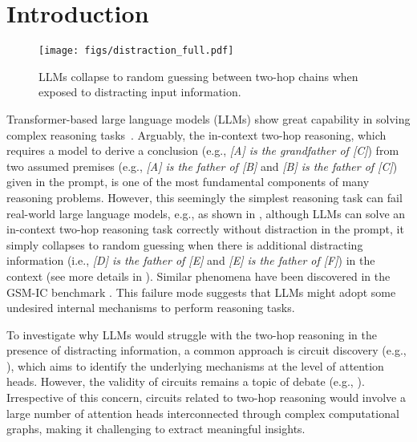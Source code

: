 \section{Introduction}
\label{sec:intro}

\begin{figure}[h]
    \centering
    \texttt{[image: figs/distraction\_full.pdf]}
    \caption{LLMs collapse to random guessing between two-hop chains when exposed to distracting input information.}
    \label{fig:llm-distraction}
\end{figure}


Transformer-based large language models (LLMs) show great capability in solving complex reasoning tasks~\citep{reynolds2021prompt,kojima2022large,brown2020language,wei2022chain,wang2022self,nye2021show,cobbe2021training,zelikman2022star}. Arguably, the in-context two-hop reasoning, which requires a model to derive a conclusion (e.g., \emph{[A] is the grandfather of [C]}) from two assumed premises (e.g., \emph{[A] is the father of [B]} and \emph{[B] is the father of [C]}) given in the prompt, is one of the most fundamental components of many reasoning problems. However, this seemingly the simplest reasoning task can fail real-world large language models, e.g., as shown in , although LLMs can solve an in-context two-hop reasoning task correctly without distraction in the prompt, it simply collapses to random guessing when there is additional distracting information (i.e., \emph{[D] is the father of [E]} and \emph{[E] is the father of [F]}) in the context (see more details in ). Similar phenomena have been discovered in the GSM-IC benchmark \citep{shi_chen_misra_scales_dohan_chi_schärli_zhou}. This failure mode suggests that LLMs might adopt some undesired internal mechanisms to perform reasoning tasks. 


 To investigate why LLMs would struggle with the two-hop reasoning in the presence of distracting information, a common approach is circuit discovery (e.g., \citet{conmy2023towards}), which aims to identify the underlying mechanisms at the level of attention heads. However, the validity of circuits remains a topic of debate (e.g., \citet{shi2024hypothesis,hase2024does}). Irrespective of this concern, circuits related to two-hop reasoning would involve a large number of attention heads interconnected through complex computational graphs, making it challenging to extract meaningful insights.



